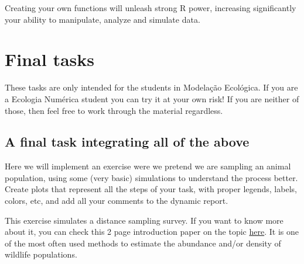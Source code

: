 \documentclass[
  letterpaper,
  DIV=11,
  numbers=noendperiod]{scrartcl}
\begin{document}
Creating your own functions will unleash strong R power, increasing
significantly your ability to manipulate, analyze and simulate data.

\section{Final tasks}\label{final-tasks}

These tasks are only intended for the students in Modelação Ecológica.
If you are a Ecologia Numérica student you can try it at your own risk!
If you are neither of those, then feel free to work through the material
regardless.

\subsection{A final task integrating all of the
above}\label{a-final-task-integrating-all-of-the-above}

Here we will implement an exercise were we pretend we are sampling an
animal population, using some (very basic) simulations to understand the
process better. Create plots that represent all the steps of your task,
with proper legends, labels, colors, etc, and add all your comments to
the dynamic report.

This exercise simulates a distance sampling survey. If you want to know
more about it, you can check this 2 page introduction paper on the topic
\href{https://github.com/TiagoAMarques/AnIntro2RTutorial/blob/40f353b63cb465c36dfa8f358e0e0d1cba45967a/Marques2009b.pdf}{here}.
It is one of the most often used methods to estimate the abundance
and/or density of wildlife populations.
\end{document}
